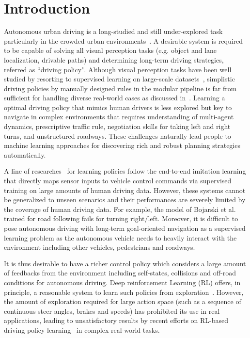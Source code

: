 \documentclass[runningheads]{llncs}
\begin{document}
\section{Introduction}

Autonomous urban driving is a long-studied and still under-explored task~\cite{pomerleau1989alvinn,silver2010learning} particularly in the crowded urban
environments~\cite{paden2016survey}. A desirable system is required to be capable of solving all visual perception tasks (e.g. object and lane localization, drivable paths) and determining long-term driving strategies, referred as ``driving policy". Although visual perception tasks have been well studied by resorting to supervised learning on large-scale datasets~\cite{zhang2016faster,liang2018dynamic}, simplistic driving policies by manually designed rules in the modular pipeline is far from sufficient for handling diverse real-world cases as discussed in~\cite{shalev2016safe,sallab2017deep}. Learning a optimal driving policy that mimics human drivers is less explored but key to navigate in complex environments that requires understanding of multi-agent dynamics, prescriptive traffic rule, negotiation skills for taking left and right turns, and unstructured roadways. These challenges naturally lead people to machine learning approaches for discovering rich and robust planning strategies automatically.

A line of researches~\cite{bojarski2016end,xu2017end,kim2017interpretable,codevilla2017end,muller2006off,hou2017fast} for learning policies follow the end-to-end imitation learning that directly maps sensor inputs to vehicle control commands via supervised training on large amounts of human driving data. However, these systems cannot be generalized to unseen scenarios and their performances are severely limited by the coverage of human driving data. For example, the model of Bojarski et al.~\cite{bojarski2016end} trained for road following fails for turning right/left. Moreover, it is difficult
to pose autonomous driving with long-term goal-oriented navigation as a supervised learning problem as the autonomous vehicle needs to heavily interact with the environment including other vehicles, pedestrians and roadways.

It is thus desirable to have a richer control policy which considers a large amount of feedbacks from the environment including self-states, collisions and off-road conditions for autonomous driving. Deep reinforcement
Learning (RL) offers, in principle, a reasonable system to learn such policies from exploration~\cite{sutton1998reinforcement}. However, the amount of exploration required for large action space (such as a sequence of continuous steer angles, brakes and speeds) has prohibited its use in real applications, leading to unsatisfactory results by recent efforts on RL-based driving policy learning~\cite{dosovitskiy2017carla,shalev2016safe} in complex real-world tasks.
\end{document}
